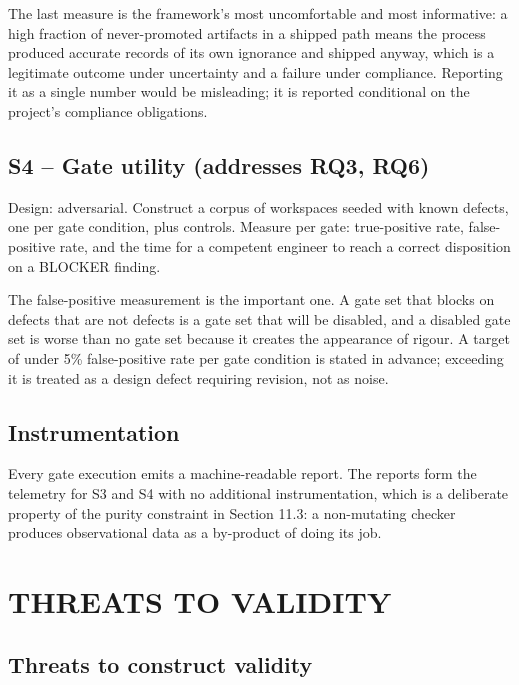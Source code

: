 \documentclass[11pt,a4paper]{article}
\begin{document}
The last measure is the framework's most uncomfortable and most informative: a high fraction of never-promoted artifacts in a shipped path means the process produced accurate records of its own ignorance and shipped anyway, which is a legitimate outcome under uncertainty and a failure under compliance. Reporting it as a single number would be misleading; it is reported conditional on the project's compliance obligations.

\subsection{S4 -- Gate utility (addresses RQ3, RQ6)}

Design: adversarial. Construct a corpus of workspaces seeded with known defects, one per gate condition, plus controls. Measure per gate: true-positive rate, false-positive rate, and the time for a competent engineer to reach a correct disposition on a BLOCKER finding.

The false-positive measurement is the important one. A gate set that blocks on defects that are not defects is a gate set that will be disabled, and a disabled gate set is worse than no gate set because it creates the appearance of rigour. A target of under 5\% false-positive rate per gate condition is stated in advance; exceeding it is treated as a design defect requiring revision, not as noise.

\subsection{Instrumentation}

Every gate execution emits a machine-readable report. The reports form the telemetry for S3 and S4 with no additional instrumentation, which is a deliberate property of the purity constraint in Section 11.3: a non-mutating checker produces observational data as a by-product of doing its job.

\section{THREATS TO VALIDITY}

\subsection{Threats to construct validity}
\end{document}
